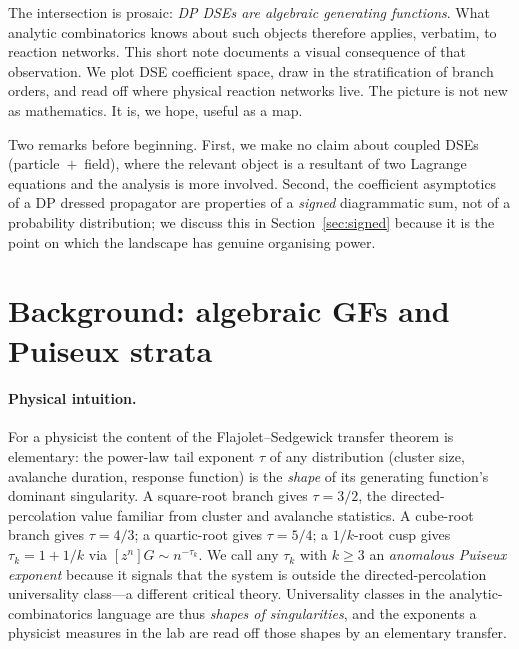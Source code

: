 \documentclass[11pt,a4paper]{article}
\theoremstyle{plain}
\theoremstyle{remark}
\begin{document}
The intersection is prosaic: \emph{DP DSEs are algebraic
generating functions}.  What analytic combinatorics knows about
such objects therefore applies, verbatim, to reaction networks.
This short note documents a visual consequence of that
observation.  We plot DSE coefficient space, draw in the
stratification of branch orders, and read off where physical
reaction networks live.  The picture is not new as mathematics.
It is, we hope, useful as a map.

Two remarks before beginning.  First, we make no claim about
coupled DSEs (particle~$+$~field), where the relevant object is
a resultant of two Lagrange equations and the analysis is more
involved.  Second, the coefficient asymptotics of a DP dressed
propagator are properties of a \emph{signed} diagrammatic sum,
not of a probability distribution; we discuss this in
Section~\ref{sec:signed} because it is the point on which the
landscape has genuine organising power.

\section{Background: algebraic GFs and Puiseux strata}
\label{sec:background}

\paragraph{Physical intuition.}
For a physicist the content of the Flajolet--Sedgewick transfer
theorem is elementary: the power-law tail exponent $\tau$ of any
distribution (cluster size, avalanche duration, response
function) is the \emph{shape} of its generating function's
dominant singularity.  A square-root branch gives $\tau = 3/2$,
the directed-percolation value familiar from cluster and
avalanche statistics.  A cube-root branch gives $\tau = 4/3$; a
quartic-root gives $\tau = 5/4$; a $1/k$-root cusp gives
$\tau_{k} = 1+1/k$ via $[z^{n}]G \sim n^{-\tau_{k}}$.  We call
any $\tau_{k}$ with $k\geq 3$ an \emph{anomalous Puiseux
exponent} because it signals that the system is outside the
directed-percolation universality class---a different critical
theory.  Universality classes in the
analytic-combinatorics language are thus \emph{shapes of
singularities}, and the exponents a physicist measures in the
lab are read off those shapes by an elementary transfer.
\end{document}
